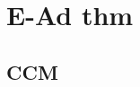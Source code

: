 \documentclass[a4paper]{article}
\newtheorem{theorem}{Theorem}
\renewcommand\P{\mathbb{P}} %
\newcommand\EU{\mathrm{EU}}
\newcommand\EAd{\mathrm{EAd}}
\newcommand{\Decs}{\mathcal{D}}
\newcommand\s{\mathsf{s}}
\newcommand{\IB}{\mathbb{B}}
\newcommand{\IP}{\P}
\renewcommand{\color}[1]{}
\newcommand\SetDelimiter[1][]{
	\nonscript\,#1\vert \allowbreak \nonscript\,\mathopen{}}
\providecommand\given{\SetDelimiter}
\renewcommand{\emptyset}{\varnothing}
\renewcommand{\geq}{\geqslant}
\newenvironment{CCM rewritten}
{\begingroup\color{blue}} %
{\endgroup}              %
\begin{document}
\newpage
\color{blue}
\section{E-Ad thm}



\subsection{CCM}


%
%
%
%	
%	
%	
%	
%	
%	
%	
%	
\end{document}
